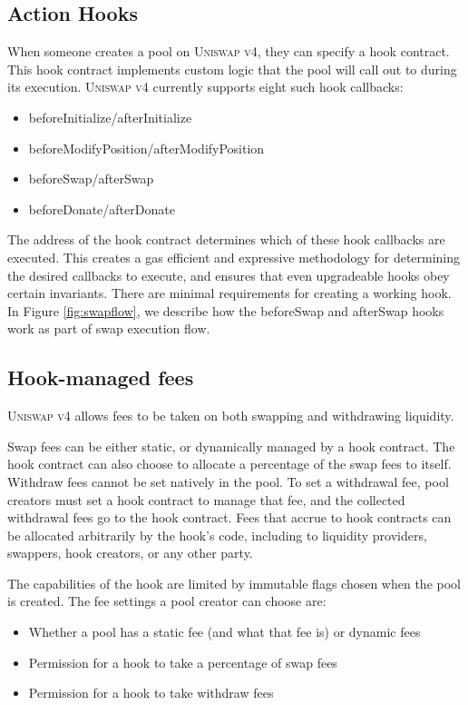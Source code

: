 \documentclass[sigconf,nonacm,prologue,table]{acmart}
\numberwithin{equation}{section}
\theoremstyle{definition}
\theoremstyle{remark}
\begin{document}
\subsection{Action Hooks} \label{actionhooks}

When someone creates a pool on \textsc{Uniswap v4}, they can specify a hook contract. This hook contract implements custom logic that the pool will call out to during its execution. 
\textsc{Uniswap v4} currently supports eight such hook callbacks:

\begin{itemize}
\item beforeInitialize/afterInitialize
\item beforeModifyPosition/afterModifyPosition
\item beforeSwap/afterSwap
\item beforeDonate/afterDonate
\end{itemize}

The address of the hook contract determines which of these hook callbacks are executed. This creates a gas efficient and expressive methodology for determining the desired callbacks to execute, and ensures that even upgradeable hooks obey certain invariants. There are minimal requirements for creating a working hook. In Figure \ref{fig:swapflow}, we describe how the beforeSwap and afterSwap hooks work as part of swap execution flow.

\subsection{Hook-managed fees} \label{hookfees}

\textsc{Uniswap v4} allows fees to be taken on both swapping and withdrawing liquidity. 

Swap fees can be either static, or dynamically managed by a hook contract. The hook contract can also choose to allocate a percentage of the swap fees to itself. Withdraw fees cannot be set natively in the pool. To set a withdrawal fee, pool creators must set a hook contract to manage that fee, and the collected withdrawal fees go to the hook contract. Fees that accrue to hook contracts can be allocated arbitrarily by the hook’s code, including to liquidity providers, swappers, hook creators, or any other party. 

The capabilities of the hook are limited by immutable flags chosen when the pool is created. The fee settings a pool creator can choose are:
\begin{itemize}
    \item Whether a pool has a static fee (and what that fee is) or dynamic fees
    \item Permission for a hook to take a percentage of swap fees 
    \item Permission for a hook to take withdraw fees
\end{itemize}
\end{document}
